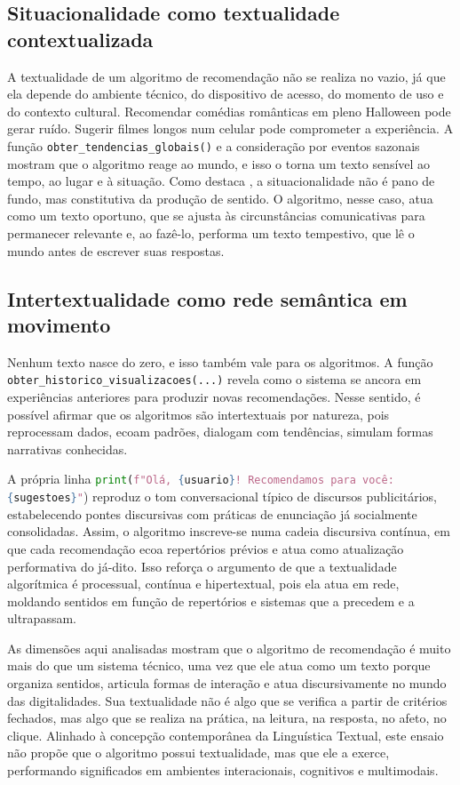 \documentclass[portuguese]{textolivre}
\begin{document}
\subsection{Situacionalidade como textualidade contextualizada}\label{sec-idioma}
A textualidade de um algoritmo de recomendação não se realiza no vazio, já que ela depende do ambiente técnico, do dispositivo de acesso, do momento de uso e do contexto cultural. Recomendar comédias românticas em pleno Halloween pode gerar ruído. Sugerir filmes longos num celular pode comprometer a experiência. A função \lstinline[language=Python]{obter_tendencias_globais()} e a consideração por eventos sazonais mostram que o algoritmo reage ao mundo, e isso o torna um texto sensível ao tempo, ao lugar e à situação. Como destaca \textcite{marcuschi2008}, a situacionalidade não é pano de fundo, mas constitutiva da produção de sentido. O algoritmo, nesse caso, atua como um texto oportuno, que se ajusta às circunstâncias comunicativas para permanecer relevante e, ao fazê-lo, performa um texto tempestivo, que lê o mundo antes de escrever suas respostas.

\subsection{Intertextualidade como rede semântica em movimento}\label{sec-resumo}
Nenhum texto nasce do zero, e isso também vale para os algoritmos. A função \lstinline[language=Python]{obter_historico_visualizacoes(...)} revela como o sistema se ancora em experiências anteriores para produzir novas recomendações. Nesse sentido, é possível afirmar que os algoritmos são intertextuais por natureza, pois reprocessam dados, ecoam padrões, dialogam com tendências, simulam formas narrativas conhecidas.

A própria linha \lstinline[language=Python]|print(f"Olá, {usuario}! Recomendamos para você: {sugestoes}"|) reproduz o tom conversacional típico de discursos publicitários, estabelecendo pontes discursivas com práticas de enunciação já socialmente consolidadas. Assim, o algoritmo inscreve-se numa cadeia discursiva contínua, em que cada recomendação ecoa repertórios prévios e atua como atualização performativa do já-dito. Isso reforça o argumento de que a textualidade algorítmica é processual, contínua e hipertextual, pois ela atua em rede, moldando sentidos em função de repertórios e sistemas que a precedem e a ultrapassam.

As dimensões aqui analisadas mostram que o algoritmo de recomendação é muito mais do que um sistema técnico, uma vez que ele atua como um texto porque organiza sentidos, articula formas de interação e atua discursivamente no mundo das digitalidades. Sua textualidade não é algo que se verifica a partir de critérios fechados, mas algo que se realiza na prática, na leitura, na resposta, no afeto, no clique. Alinhado à concepção contemporânea da Linguística Textual, este ensaio não propõe que o algoritmo possui textualidade, mas que ele a exerce, performando significados em ambientes interacionais, cognitivos e multimodais.
\end{document}
